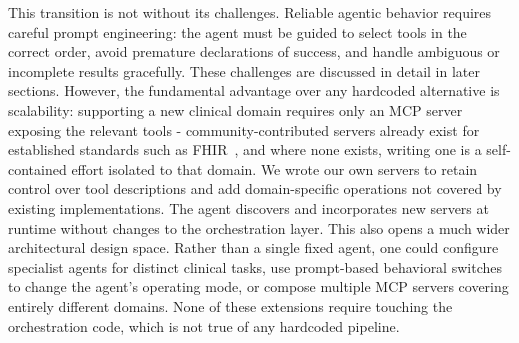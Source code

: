 \documentclass[conference]{IEEEtran}
\begin{document}
This transition is not without its challenges. Reliable agentic behavior requires careful prompt engineering: the agent must be guided to select tools in the correct order, avoid premature declarations of success, and handle ambiguous or incomplete results gracefully. These challenges are discussed in detail in later sections.
However, the fundamental advantage over any hardcoded alternative is scalability: supporting a new clinical domain requires only an MCP server exposing the relevant tools - community-contributed servers already exist for established standards such as FHIR~\cite{ehtesham2025mcpfhir}, and where none exists, writing one is a self-contained effort isolated to that domain. We wrote our own servers to retain control over tool descriptions and add domain-specific operations not covered by existing implementations. The agent discovers and incorporates new servers at runtime without changes to the orchestration layer. This also opens a much wider architectural design space. Rather than a single fixed agent, one could configure specialist agents for distinct clinical tasks, use prompt-based behavioral switches to change the agent's operating mode, or compose multiple MCP servers covering entirely different domains.
None of these extensions require touching the orchestration code, which is not true of any hardcoded pipeline.

\end{document}
